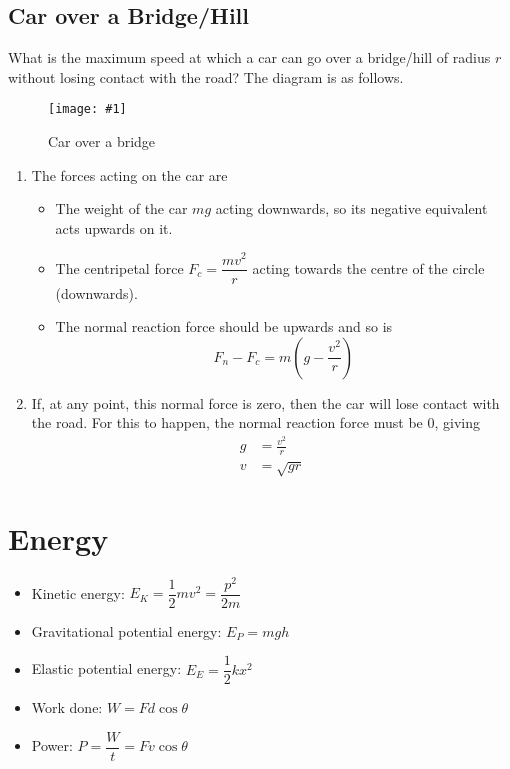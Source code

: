 \documentclass[a4paper,12pt]{article}
\let\oldsection\section
\renewcommand\section{\clearpage\oldsection}
\newcommand{\img}[4]{\begin{center}
  \begin{figure}[H]
    \centering
    \texttt{[image: \#1]}
    \caption{#3}
    \label{fig:#4}
  \end{figure}
\end{center}}
\begin{document}
\pagebreak

\subsection{Car over a Bridge/Hill}

What is the maximum speed at which a car can go over a bridge/hill of radius $r$ without losing contact with the road? The diagram is as follows.

\img{material/bridge.png}{0.4}{Car over a bridge}{bridge}
\begin{enumerate}
  \item The forces acting on the car are
        \begin{itemize}
          \item The weight of the car $mg$ acting downwards, so its negative equivalent acts upwards on it.
          \item The centripetal force $F_c = \dfrac{mv^2}{r}$ acting towards the centre of the circle (downwards).
          \item The normal reaction force should be upwards and so is $$F_n - F_c = m\left(g - \frac{v^2}{r}\right)$$
        \end{itemize}
  \item If, at any point, this normal force is zero, then the car will lose contact with the road. For this to happen, the normal reaction force must be $0$, giving
        \begin{align*}
          g & = \frac{v^2}{r} \\
          v & = \sqrt{gr}
        \end{align*}
\end{enumerate}

\section{Energy}

\begin{itemize}
  \item Kinetic energy: $E_K = \dfrac{1}{2}mv^2 = \dfrac{p^2}{2m}$
  \item Gravitational potential energy: $E_P = mgh$
  \item Elastic potential energy: $E_E = \dfrac{1}{2}kx^2$
  \item Work done: $W = Fd\cos \theta$
  \item Power: $P = \dfrac{W}{t} = Fv\cos \theta$
\end{itemize}
\end{document}
